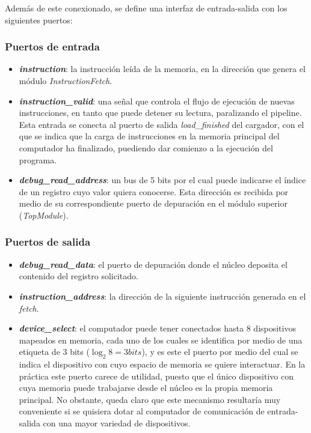 Además de este conexionado, se define una interfaz de entrada-salida con los siguientes puertos:

\subsubsection{Puertos de entrada}
\begin{itemize}
  \item \textbf{\textit{instruction}}: la instrucción leída de la memoria, en la dirección que genera el módulo \textit{InstructionFetch}.
  \vspace{-0.2cm}
  \item \textbf{\textit{instruction\_valid}}: una señal que controla el flujo de ejecución de nuevas instrucciones, en tanto que puede detener su lectura, paralizando el pipeline. Esta entrada se conecta al puerto de salida \textit{load\_finished} del cargador, con el que se indica que la carga de instrucciones en la memoria principal del computador ha finalizado, puediendo dar comienzo a la ejecución del programa.
  \vspace{-0.2cm}
  \item \textbf{\textit{debug\_read\_address}}: un bus de 5 bits por el cual puede indicarse el índice de un registro cuyo valor quiera conocerse. Esta dirección es recibida por medio de su correspondiente puerto de depuración en el módulo superior (\textit{TopModule}).
\end{itemize}

\subsubsection{Puertos de salida}
\begin{itemize}
  \item \textbf{\textit{debug\_read\_data}}: el puerto de depuración donde el núcleo deposita el contenido del registro solicitado.
  \vspace{-0.2cm}
  \item \textbf{\textit{instruction\_address}}: la dirección de la siguiente instrucción generada en el \textit{fetch}.
  \vspace{-0.2cm}
  \item \textbf{\textit{device\_select}}: el computador puede tener conectados hasta 8 dispositivos mapeados en memoria, cada uno de los cuales se identifica por medio de una etiqueta de 3 bits ($\log_2 8 = 3 bits$), y es este el puerto por medio del cual se indica el dispositivo con cuyo espacio de memoria se quiere interactuar. En la práctica este puerto carece de utilidad, puesto que el único dispositivo con cuya memoria puede trabajarse desde el núcleo es la propia memoria principal. No obstante, queda claro que este mecanismo resultaría muy conveniente si se quisiera dotar al computador de comunicación de entrada-salida con una mayor variedad de dispositivos.
\end{itemize}

